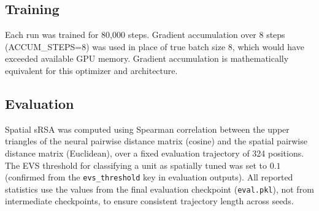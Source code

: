 \documentclass[11pt, a4paper]{article}
\begin{document}
\subsection*{Training}
Each run was trained for 80,000 steps. Gradient accumulation over 8 steps
(ACCUM\_STEPS=8) was used in place of true batch size 8, which would have
exceeded available GPU memory. Gradient accumulation is mathematically
equivalent for this optimizer and architecture.

\subsection*{Evaluation}
Spatial sRSA was computed using Spearman correlation between the upper
triangles of the neural pairwise distance matrix (cosine) and the spatial
pairwise distance matrix (Euclidean), over a fixed evaluation trajectory
of 324 positions. The EVS threshold for classifying a unit as spatially
tuned was set to $0.1$ (confirmed from the \texttt{evs\_threshold} key
in evaluation outputs). All reported statistics use the values from the
final evaluation checkpoint (\texttt{eval.pkl}), not from intermediate
checkpoints, to ensure consistent trajectory length across seeds.
\end{document}

